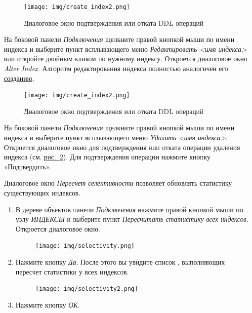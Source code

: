 \begin{figure}[H]
	\caption{Диалоговое окно подтверждения или отката DDL операций}\label{ris:01}
	\centering
	\texttt{[image: img/create\_index2.png]}
\end{figure}

На боковой панели \textit{Подключения} щелкните правой кнопкой мыши по имени индекса и выберите пункт всплывающего меню \textit{Редактировать <имя индекса>} или откройте двойным кликом по нужному индексу. Откроется диалоговое окно \textit{Alter Index}. Алгоритм редактирования индекса полностью аналогичен его \hyperref[sec:crind]{созданию}.

\begin{figure}[H]
	\caption{Диалоговое окно подтверждения или отката DDL операций}\label{ris:01}
	\centering
	\texttt{[image: img/create\_index2.png]}
\end{figure}

На боковой панели \textit{Подключения} щелкните правой кнопкой мыши по имени индекса и выберите пункт всплывающего меню \textit{Удалить <имя индекса>}. Откроется  диалоговое окно для подтверждения или отката операции удаления индекса (см. \hyperref[ris:01]{рис.~\ref{ris:01}}). Для подтверждения операции нажмите кнопку «Подтвердить».

\label{sec:crind}

Диалоговое окно \textit{Пересчет селективности} позволяет обновлять статистику существующих индексов.

\begin{enumerate}[leftmargin=26pt]
	\item В дереве объектов панели \textit{Подключения} нажмите правой кнопкой мыши по узлу \textit{ИНДЕКСЫ} и выберите пункт \textit{Пересчитать статистику всех индексов}. Откроется диалоговое окно.
	\begin{figure}[H]
		\centering
		\texttt{[image: img/selectivity.png]}
	\end{figure}	
	\item Нажмите кнопку \textit{Да}. После этого вы увидите список , выполняющих пересчет статистики у всех индексов.  
	\begin{figure}[H]
		\centering
		\texttt{[image: img/selectivity2.png]}
	\end{figure}	
	\item Нажмите кнопку \textit{ОК}.
\end{enumerate}


